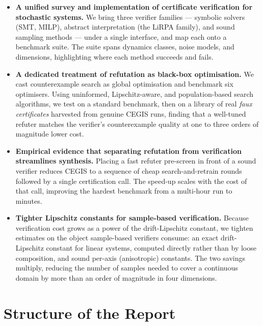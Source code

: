 \begin{itemize}
    \item \textbf{A unified survey and implementation of certificate
      verification for stochastic systems.} We bring three verifier families
      --- symbolic solvers (SMT, MILP), abstract interpretation (the LiRPA
      family), and sound sampling methods --- under a single interface, and map
      each onto a benchmark suite. The suite spans dynamics classes, noise models, and dimensions,
      highlighting where each method succeeds and fails.

    \item \textbf{A dedicated treatment of refutation as black-box
      optimisation.} We cast counterexample search as global optimisation and
      benchmark six optimisers. Using uninformed,
      Lipschitz-aware, and population-based search algorithms, we test on a standard benchmark, then on a library of real \emph{faux
      certificates} harvested from genuine CEGIS runs, finding that a well-tuned
      refuter matches the verifier's counterexample quality at one to three
      orders of magnitude lower cost.

    \item \textbf{Empirical evidence that separating refutation from verification
      streamlines synthesis.} Placing a fast refuter pre-screen in front of a
      sound verifier reduces CEGIS to a sequence of cheap search-and-retrain
      rounds followed by a single certification call. The speed-up scales with
      the cost of that call, improving the hardest benchmark from a multi-hour run to minutes.

    \item \textbf{Tighter Lipschitz constants for sample-based verification.}
      Because verification cost grows as a power of the drift-Lipschitz constant,
      we tighten estimates on the object sample-based verifiers consume: an exact drift-Lipschitz
      constant for linear systems, computed directly rather than by loose
      composition, and sound per-axis (anisotropic) constants. The two savings
      multiply, reducing the number of samples needed to cover a continuous
      domain by more than an order of magnitude in four dimensions.
\end{itemize}

\section{Structure of the Report}

